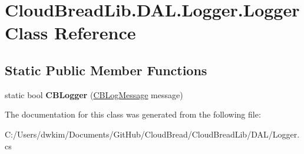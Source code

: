 \hypertarget{class_cloud_bread_lib_1_1_d_a_l_1_1_logger_1_1_logger}{}\section{Cloud\+Bread\+Lib.\+D\+A\+L.\+Logger.\+Logger Class Reference}
\label{class_cloud_bread_lib_1_1_d_a_l_1_1_logger_1_1_logger}
\subsection*{Static Public Member Functions}
\begin{DoxyCompactItemize}
\item 
static bool {\bfseries C\+B\+Logger} (\hyperlink{class_cloud_bread_lib_1_1_d_a_l_1_1_logger_1_1_c_b_log_message}{C\+B\+Log\+Message} message)\hypertarget{class_cloud_bread_lib_1_1_d_a_l_1_1_logger_1_1_logger_ad9c33ab1f20fe8a8d49bd258d50b1738}{}\label{class_cloud_bread_lib_1_1_d_a_l_1_1_logger_1_1_logger_ad9c33ab1f20fe8a8d49bd258d50b1738}

\end{DoxyCompactItemize}


The documentation for this class was generated from the following file\+:\begin{DoxyCompactItemize}
\item 
C\+:/\+Users/dwkim/\+Documents/\+Git\+Hub/\+Cloud\+Bread/\+Cloud\+Bread\+Lib/\+D\+A\+L/Logger.\+cs\end{DoxyCompactItemize}
